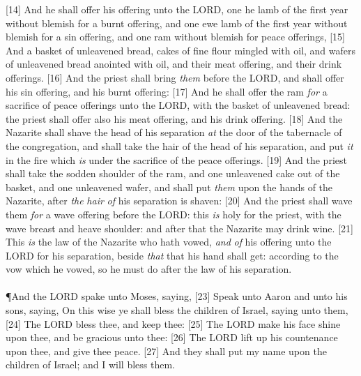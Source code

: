 [14] \textcolor[cmyk]{0.99998,1,0,0}{And he shall offer his offering unto the LORD, one he lamb of the first year without blemish for a burnt offering, and one ewe lamb of the first year without blemish for a sin offering, and one ram without blemish for peace offerings,}
[15] \textcolor[cmyk]{0.99998,1,0,0}{And a basket of unleavened bread, cakes of fine flour mingled with oil, and wafers of unleavened bread anointed with oil, and their meat offering, and their drink offerings.}
[16] \textcolor[cmyk]{0.99998,1,0,0}{And the priest shall bring \emph{them} before the LORD, and shall offer his sin offering, and his burnt offering:}
[17] \textcolor[cmyk]{0.99998,1,0,0}{And he shall offer the ram \emph{for} a sacrifice of peace offerings unto the LORD, with the basket of unleavened bread: the priest shall offer also his meat offering, and his drink offering.}
[18] \textcolor[cmyk]{0.99998,1,0,0}{And the Nazarite shall shave the head of his separation \emph{at} the door of the tabernacle of the congregation, and shall take the hair of the head of his separation, and put \emph{it} in the fire which \emph{is} under the sacrifice of the peace offerings.}
[19] \textcolor[cmyk]{0.99998,1,0,0}{And the priest shall take the sodden shoulder of the ram, and one unleavened cake out of the basket, and one unleavened wafer, and shall put \emph{them} upon the hands of the Nazarite, after \emph{the} \emph{hair} \emph{of} his separation is shaven:}
[20] \textcolor[cmyk]{0.99998,1,0,0}{And the priest shall wave them \emph{for} a wave offering before the LORD: this \emph{is} holy for the priest, with the wave breast and heave shoulder: and after that the Nazarite may drink wine.}
[21] \textcolor[cmyk]{0.99998,1,0,0}{This \emph{is} the law of the Nazarite who hath vowed, \emph{and} \emph{of} his offering unto the LORD for his separation, beside \emph{that} that his hand shall get: according to the vow which he vowed, so he must do after the law of his separation.}\\
\\
\P \textcolor[cmyk]{0.99998,1,0,0}{And the LORD spake unto Moses, saying,}
[23] \textcolor[cmyk]{0.99998,1,0,0}{Speak unto Aaron and unto his sons, saying, On this wise ye shall bless the children of Israel, saying unto them,}
[24] \textcolor[cmyk]{0.99998,1,0,0}{The LORD bless thee, and keep thee:}
[25] \textcolor[cmyk]{0.99998,1,0,0}{The LORD make his face shine upon thee, and be gracious unto thee:}
[26] \textcolor[cmyk]{0.99998,1,0,0}{The LORD lift up his countenance upon thee, and give thee peace.}
[27] \textcolor[cmyk]{0.99998,1,0,0}{And they shall put my name upon the children of Israel; and I will bless them.}